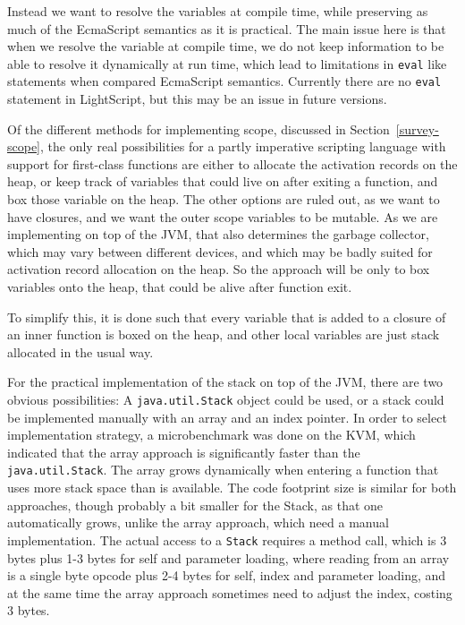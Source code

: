\documentclass[11pt]{report}
\begin{document}
Instead we want to resolve the variables at compile time, while preserving as much of the EcmaScript semantics as it is practical. The main issue here is that when we resolve the variable at compile time, we do not keep information to be able to resolve it dynamically at run time,
which lead to limitations in \verb|eval| like statements when compared EcmaScript semantics. Currently there are no \verb|eval| statement in LightScript, but this may be an issue in future versions.

Of the different methods for implementing scope, discussed in Section~\ref{survey-scope}, the only real possibilities for a partly imperative scripting language with support for first-class functions are either to allocate the activation records on the heap, or keep track of variables that could live on after exiting a function, and box those variable on the heap.
The other options are ruled out, as we want to have closures, and we want the outer scope variables to be mutable.
As we are implementing on top of the JVM, that also determines the garbage collector, which may vary between different devices, and which may be badly suited for activation record allocation on the heap.
So the approach will be only to box variables onto the heap, that could be alive after function exit.

To simplify this, it is done such that every variable that is added to a closure of an inner function is boxed on the heap, and other local variables are just stack allocated in the usual way. 

For the practical implementation of the stack on top of the JVM, there are two obvious possibilities: A \verb|java.util.Stack| object could be used, or a stack could be implemented manually with an array and an index pointer. 
In order to select implementation strategy, a microbenchmark was done on the KVM, which indicated that the array approach is significantly faster than the \verb|java.util.Stack|. The array grows dynamically when entering a function that uses more stack space than is available. 
The code footprint size is similar for both approaches, though probably a bit smaller for the Stack, as that one automatically grows, unlike the array approach, which need a manual implementation.
The actual access to a \verb|Stack| requires a method call, which is 3 bytes plus 1-3 bytes for self and parameter loading, where reading from an array is a single byte opcode plus 2-4 bytes for self, index and parameter loading, and at the same time the array approach sometimes need to adjust the index, costing 3 bytes.
\end{document}
